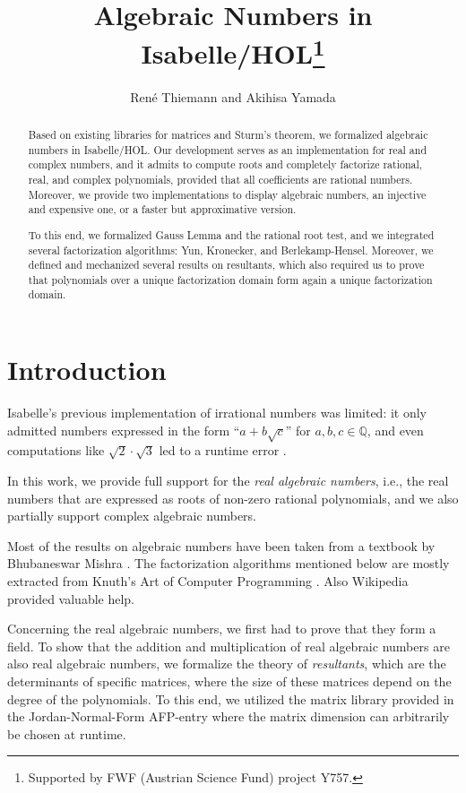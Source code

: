 \documentclass[11pt,a4paper]{article}
\newcommand\rats{\mathbb{Q}}
\newcommand\rais{real algebraic numbers\xspace}
\begin{document}
\title{Algebraic Numbers in Isabelle/HOL\footnote{Supported by FWF (Austrian Science Fund) project Y757.}}
\author{Ren\'e Thiemann and Akihisa Yamada}
\maketitle

\begin{abstract}
Based on existing libraries for matrices and Sturm's theorem,
we formalized algebraic numbers in Isabelle/HOL. Our development serves
as an implementation for real and complex numbers, and it admits to compute roots
and completely factorize rational, real, and complex polynomials, provided that all
coefficients are rational numbers. Moreover, we provide two implementations to display
algebraic numbers, an injective and expensive one, or a faster but approximative version.

To this end, we formalized Gauss Lemma and the rational root test, and
we integrated several factorization algorithms: Yun, Kronecker, and Berlekamp-Hensel.
Moreover, we defined and mechanized several results on resultants,
which also required us to prove that polynomials over a unique factorization domain form 
again a unique factorization domain. 
\end{abstract}

\tableofcontents

\section{Introduction}

Isabelle's previous implementation of irrational numbers was limited:
it only admitted numbers expressed in the form ``$a+b\sqrt{c}$'' for $a,b,c \in \rats$,
and even computations like $\sqrt2 \cdot \sqrt3$ led to a runtime error \cite{Real-AFP}.

In this work, we provide full support for the \emph{real algebraic numbers},
i.e., the real numbers that are expressed as roots of non-zero rational polynomials,
and we also partially support complex algebraic numbers.

Most of the results on algebraic numbers have been taken from a textbook 
by Bhubaneswar Mishra \cite{AlgNumbers}.
The factorization algorithms mentioned below are mostly extracted 
from Knuth's Art of Computer Programming
\cite{Knuth}. Also Wikipedia provided valuable help.

\medskip
Concerning the real algebraic numbers, we first had to prove that they form a field.
To show that the addition and multiplication of \rais are also \rais,
we formalize the theory of \emph{resultants}, which are the determinants of 
specific matrices, where the size of these matrices depend on the degree of the 
polynomials. To this end, we utilized the matrix library provided in the Jordan-Normal-Form
AFP-entry \cite{JNF-AFP} where the matrix dimension can arbitrarily be chosen at runtime.
\end{document}
